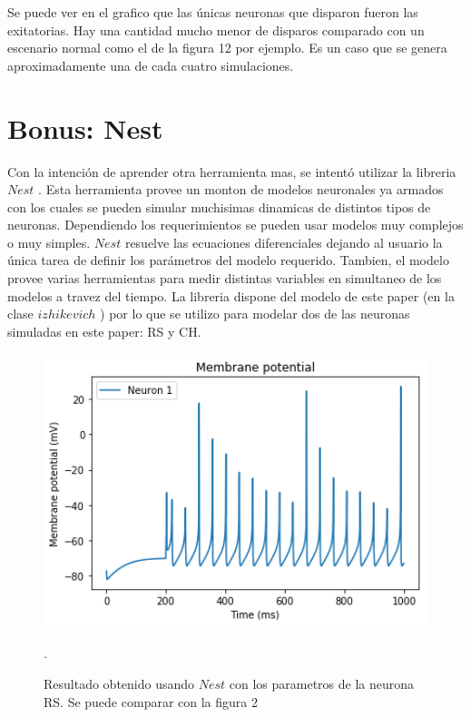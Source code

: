 \documentclass[12pt]{article}
\begin{document}
\newpage

Se puede ver en el grafico que las únicas neuronas que disparon fueron las exitatorias.
Hay una cantidad mucho menor de disparos comparado con un escenario normal como el de la figura 12 por ejemplo.
Es un caso que se genera aproximadamente una de cada cuatro simulaciones.

\newpage

\section{Bonus: Nest}

Con la intención de aprender otra herramienta mas, se intentó utilizar la libreria $Nest$ \cite{Nest}. Esta herramienta provee un monton de modelos neuronales ya armados con los cuales se pueden simular muchisimas dinamicas de distintos tipos de neuronas.
Dependiendo los requerimientos se pueden usar modelos muy complejos o muy simples.
$Nest$ resuelve las ecuaciones diferenciales dejando al usuario la única tarea de definir los parámetros del modelo requerido.
Tambien, el modelo provee varias herramientas para medir distintas variables en simultaneo de los modelos a travez del tiempo.
La libreria dispone del modelo de este paper (en la clase $izhikevich$ \cite{nest_izhikevich}) por lo que se utilizo para modelar dos de las neuronas simuladas en este paper: RS y CH.

\begin{figure}[h!]
    \centering
        \includegraphics[height=8cm]{images/RS_nest.png}
    \caption[fontsize=2pt]{Resultado obtenido usando $Nest$ con los parametros de la neurona RS. Se puede comparar con la figura 2}.
\end{figure}
\end{document}
